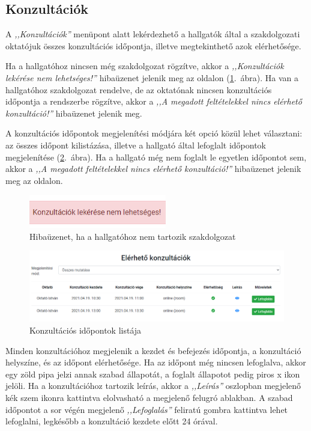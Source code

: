 \documentclass[
]{thesis-ekf}
\theoremstyle{definition}
\theoremstyle{remark}
\begin{document}
	\subsection{Konzultációk}
	A \emph{,,Konzultációk''} menüpont alatt lekérdezhető a hallgatók által a szakdolgozati oktatójuk összes konzultációs időpontja, illetve megtekinthető azok elérhetősége.
	
	Ha a hallgatóhoz nincsen még szakdolgozat rögzítve, akkor a \emph{,,Konzultációk lekérése nem lehetséges!''} hibaüzenet jelenik meg az oldalon (\ref{fig:hallgato_konzultacio_nincs_szakdolgozat}.~ábra). Ha van a hallgatóhoz szakdolgozat rendelve, de az oktatónak nincsen konzultációs időpontja a rendszerbe rögzítve, akkor a \emph{,,A megadott feltételekkel nincs elérhető konzultáció!''} hibaüzenet jelenik meg.
	
	A konzultációs időpontok megjelenítési módjára két opció közül lehet választani: az összes időpont kilistázása, illetve a hallgató által lefoglalt időpontok megjelenítése (\ref{fig:hallgato_konzultacio_idopontok}.~ábra). Ha a hallgató még nem foglalt le egyetlen időpontot sem, akkor a \emph{,,A megadott feltételekkel nincs elérhető konzultáció!''} hibaüzenet jelenik meg az oldalon.
	
		\begin{figure}[!h]
		\centering
		\includegraphics[width=6cm]{kepek/screenshots/hallgato_konzultacio_nincs_szakdolgozat.png}
		\caption{Hibaüzenet, ha a hallgatóhoz nem tartozik szakdolgozat}
		\label{fig:hallgato_konzultacio_nincs_szakdolgozat}
	\end{figure}
	
	\begin{figure}[!h]
		\centering
		\includegraphics[width=12cm]{kepek/screenshots/hallgato_konzultacio_idopontok.png}
		\caption{Konzultációs időpontok listája}
		\label{fig:hallgato_konzultacio_idopontok}
	\end{figure}
	
	Minden konzultációhoz megjelenik a kezdet és befejezés időpontja, a konzultáció helyszíne, és az időpont elérhetősége. Ha az időpont még nincsen lefoglalva, akkor egy zöld pipa jelzi annak szabad állapotát, a foglalt állapotot pedig piros x ikon jelöli. Ha a konzultációhoz tartozik leírás, akkor a \emph{,,Leírás''} oszlopban megjelenő kék szem ikonra kattintva elolvasható a megjelenő felugró ablakban. A szabad időpontot a sor végén megjelenő \emph{,,Lefoglalás''} feliratú gombra kattintva lehet lefoglalni, legkésőbb a konzultáció kezdete előtt 24 órával.
	
\end{document}
